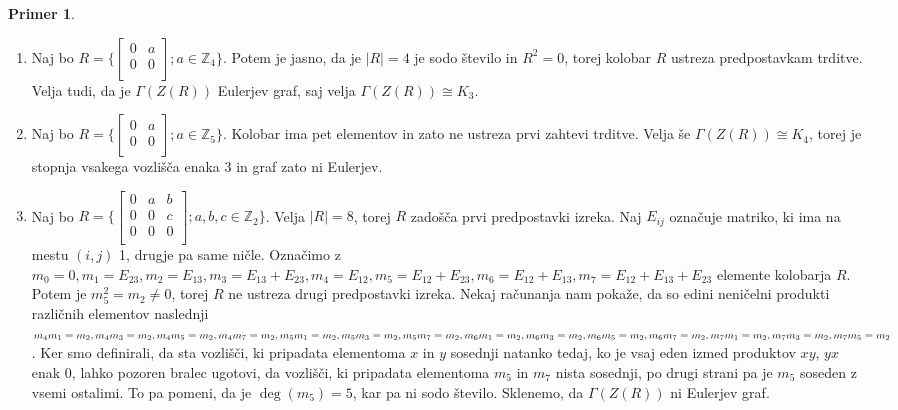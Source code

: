 \documentclass[a4paper, 12pt]{amsart}
\theoremstyle{definition} %
\newtheorem{primer}[definicija]{Primer}
\theoremstyle{plain} %
\newcommand{\Z}{\mathbb Z}
\begin{document}
\begin{primer}
\begin{enumerate}
\item Naj bo $R= \Big\{ 
\begin{bmatrix}
0 & a \\
0 & 0 \\
\end{bmatrix}; a\in \Z_4
\Big\}$. Potem je jasno, da je $|R| = 4$ je sodo število in $R^2=0$, torej kolobar $R$ ustreza predpostavkam trditve. Velja tudi, da je $\Gamma(Z(R))$ Eulerjev graf, saj velja $\Gamma(Z(R)) \cong K_3$.
\item  Naj bo $R= \Big\{ 
\begin{bmatrix}
0 & a \\
0 & 0 \\
\end{bmatrix}; a\in \Z_5
\Big\}$. Kolobar ima pet elementov in zato ne ustreza prvi zahtevi trditve. Velja še $\Gamma(Z(R)) \cong K_4$, torej je stopnja vsakega vozlišča enaka 3 in graf zato ni Eulerjev.
\item Naj bo $R= \Big\{ 
\begin{bmatrix}
0 & a  & b\\
0 & 0 & c\\
0 & 0 & 0\\
\end{bmatrix}; a,b,c\in \Z_2
\Big\}$. Velja $|R|=8$, torej $R$ zadošča prvi predpostavki izreka. Naj $E_{ij}$ označuje matriko, ki ima na mestu $(i,j)$ 1, drugje pa same ničle. Označimo z $m_0 = 0, m_1 = E_{23}, m_2 = E_{13}, m_3 = E_{13}+E_{23}, m_4 = E_{12}, m_5 =  E_{12} + E_{23}, m_6 = E_{12}+E_{13}, m_7 = E_{12}+E_{13}+E_{23}$ elemente kolobarja $R$. Potem je $m_5^2 = m_2\neq 0$, torej $R$ ne ustreza drugi predpostavki izreka. Nekaj računanja nam pokaže, da so edini neničelni produkti različnih elementov naslednji
$
m_4 m_1=m_2, m_4 m_3=m_2, m_4 m_5 = m_2,m_4 m_7 = m_2,m_5 m_1 = m_2, m_5 m_3 = m_2, m_5 m_7 = m_2, m_6 m_1 = m_2, m_6 m_3 = m_2,\\ m_6 m_5 = m_2, m_6 m_7 = m_2, m_7 m_1 = m_2, m_7 m_3 = m_2, m_7 m_5 = m_2
$. Ker smo definirali, da sta vozlišči, ki pripadata elementoma $x$ in $y$ sosednji natanko tedaj, ko je vsaj eden izmed produktov $xy$, $yx$ enak 0, lahko pozoren bralec ugotovi, da vozlišči, ki pripadata elementoma $m_5$ in $m_7$ nista sosednji, po drugi strani pa je $m_5$ soseden z vsemi ostalimi. To pa pomeni, da je $\deg(m_5) = 5$, kar pa ni sodo število. Sklenemo, da $\Gamma(Z(R))$ ni Eulerjev graf.
\end{enumerate}
\end{primer}
\end{document}
